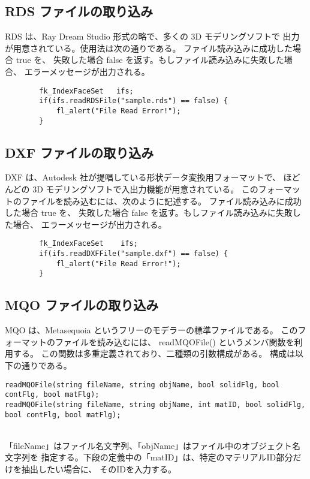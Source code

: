 \subsection{RDS ファイルの取り込み}
RDS は、Ray Dream Studio 形式の略で、多くの 3D モデリングソフトで
出力が用意されている。使用法は次の通りである。
ファイル読み込みに成功した場合 true を、
失敗した場合 false を返す。もしファイル読み込みに失敗した場合、
エラーメッセージが出力される。
\\
\begin{screen}
\begin{verbatim}
        fk_IndexFaceSet   ifs;
        if(ifs.readRDSFile("sample.rds") == false) {
            fl_alert("File Read Error!");
        }
\end{verbatim}
\end{screen}
\subsection{DXF ファイルの取り込み}
DXF は、Autodesk 社が提唱している形状データ変換用フォーマットで、
ほどんどの 3D モデリングソフトで入出力機能が用意されている。
このフォーマットのファイルを読み込むには、次のように記述する。
ファイル読み込みに成功した場合 true を、
失敗した場合 false を返す。もしファイル読み込みに失敗した場合、
エラーメッセージが出力される。
\\
\begin{screen}
\begin{verbatim}
        fk_IndexFaceSet    ifs;
        if(ifs.readDXFFile("sample.dxf") == false) {
            fl_alert("File Read Error!");
        }
\end{verbatim}
\end{screen}
\subsection{MQO ファイルの取り込み} \label{subsec:mqoread}
MQO は、Metasequoia というフリーのモデラーの標準ファイルである。
このフォーマットのファイルを読み込むには、
readMQOFile() というメンバ関数を利用する。
この関数は多重定義されており、二種類の引数構成がある。
構成は以下の通りである。
\\
\begin{screen}
\begin{small}
\begin{verbatim}
readMQOFile(string fileName, string objName, bool solidFlg, bool contFlg, bool matFlg);
readMQOFile(string fileName, string objName, int matID, bool solidFlg, bool contFlg, bool matFlg);
\end{verbatim}
\end{small}
\end{screen}
~ \\
「fileName」はファイル名文字列、「objName」はファイル中のオブジェクト名文字列を
指定する。下段の定義中の「matID」は、特定のマテリアルID部分だけを抽出したい場合に、
そのIDを入力する。

